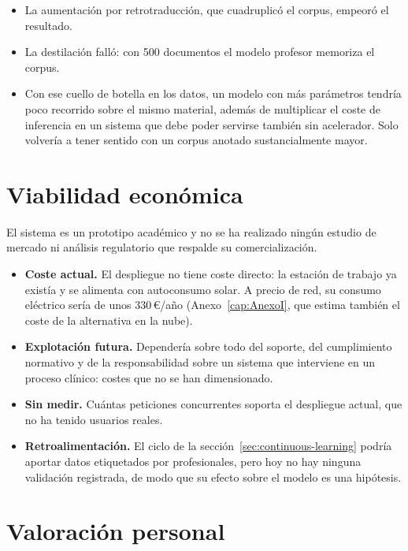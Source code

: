 \begin{itemize}
 \item La aumentación por retrotraducción, que cuadruplicó el corpus, empeoró el resultado.
 \item La destilación falló: con 500 documentos el modelo profesor memoriza el corpus.
 \item Con ese cuello de botella en los datos, un modelo con más parámetros tendría poco recorrido sobre el mismo material, además de multiplicar el coste de inferencia en un sistema que debe poder servirse también sin acelerador. Solo volvería a tener sentido con un corpus anotado sustancialmente mayor.
\end{itemize}


\section{Viabilidad económica}

El sistema es un prototipo académico y no se ha realizado ningún estudio de mercado ni análisis regulatorio que respalde su comercialización.

\begin{itemize}
 \item \textbf{Coste actual.} El despliegue no tiene coste directo: la estación de trabajo ya existía y se alimenta con autoconsumo solar. A precio de red, su consumo eléctrico sería de unos 330\,€/año (Anexo~\ref{cap:AnexoI}, que estima también el coste de la alternativa en la nube).
 \item \textbf{Explotación futura.} Dependería sobre todo del soporte, del cumplimiento normativo y de la responsabilidad sobre un sistema que interviene en un proceso clínico: costes que no se han dimensionado.
 \item \textbf{Sin medir.} Cuántas peticiones concurrentes soporta el despliegue actual, que no ha tenido usuarios reales.
 \item \textbf{Retroalimentación.} El ciclo de la sección~\ref{sec:continuous-learning} podría aportar datos etiquetados por profesionales, pero hoy no hay ninguna validación registrada, de modo que su efecto sobre el modelo es una hipótesis.
\end{itemize}

\section{Valoración personal}\label{sec:valoracion-personal}

